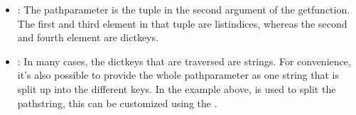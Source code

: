 \documentclass[a4paper,10pt,english]{sphinxmanual}
\begin{document}
\begin{sphinxVerbatim}[commandchars=\\\{\},numbers=left,firstnumber=1,stepnumber=1]
  \PYG{p}{[}  \PYG{p}{[}   \PYG{p}{]} \PYG{p}{[}  \PYG{p}{]}\PYG{p}{]}
    
 
\end{sphinxVerbatim}
\begin{itemize}
\item {}
\sphinxAtStartPar
{}: The path\sphinxhyphen{}parameter is the tuple in the second argument of the get\sphinxhyphen{}function. The first and third element in that tuple are list\sphinxhyphen{}indices, whereas the second and fourth element are dict\sphinxhyphen{}keys.

\item {}
\sphinxAtStartPar
{}: In many cases, the dict\sphinxhyphen{}keys that are traversed are strings. For convenience, it’s also possible to provide the whole path\sphinxhyphen{}parameter as one string that is split up into the different keys. In the example above,  is used to split the path\sphinxhyphen{}string, this can be customized using the {\hyperref[\detokenize{README:path-split}]{}} {\hyperref[\detokenize{README:fagus-options}]{}}.

\end{itemize}
\end{document}
